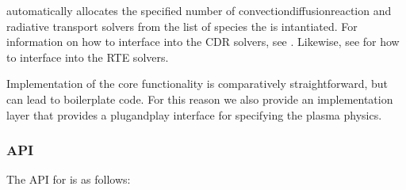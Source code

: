 \documentclass[letterpaper,10pt,english]{sphinxmanual}
\begin{document}
 automatically allocates the specified number of convection\sphinxhyphen{}diffusion\sphinxhyphen{}reaction and radiative transport solvers from the list of species the is intantiated.
For information on how to interface into the CDR solvers, see {\hyperref[\detokenize{Solvers/CDR:chap-cdrspecies}]{}}.
Likewise, see {\hyperref[\detokenize{Solvers/RTE:chap-rtspecies}]{}} for how to interface into the RTE solvers.

Implementation of the core functionality is comparatively straightforward, but can lead to boilerplate code.
For this reason we also provide an implementation layer {\hyperref[\detokenize{Applications/CdrPlasmaModel:chap-cdrplasmajson}]{}} that provides a plug\sphinxhyphen{}and\sphinxhyphen{}play interface for specifying the plasma physics.


\subsubsection{API}
\label{\detokenize{Applications/CdrPlasmaModel:api}}
The API for  is as follows:
\end{document}
